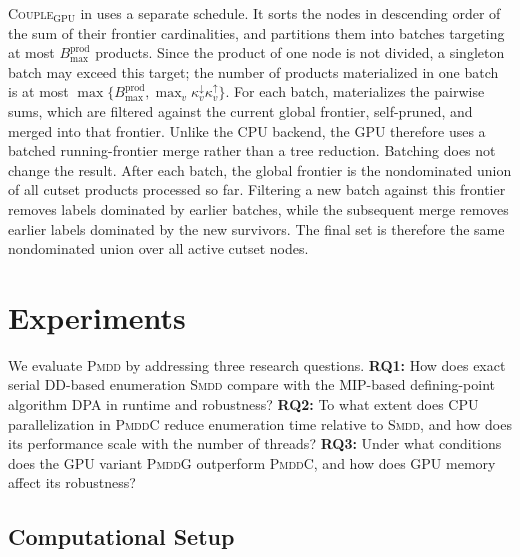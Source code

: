 \documentclass[letterpaper]{article}
\begin{document}
\textsc{Couple}$_{\mathrm{GPU}}$ in  uses a separate schedule. It sorts the nodes in descending order of the sum of their frontier cardinalities, and partitions them into batches targeting at most $B_{\max}^{\mathrm{prod}}$ products. Since the product of one node is not divided, a singleton batch may exceed this target; the number of products materialized in one batch is at most $\max\{B_{\max}^{\mathrm{prod}},\max_v \kappa_v^{\downarrow}\kappa_v^{\uparrow}\}$. For each batch,  materializes the pairwise sums, which are filtered against the current global frontier, self-pruned, and merged into that frontier. Unlike the CPU backend, the GPU therefore uses a batched running-frontier merge rather than a tree reduction. Batching does not change the result. After each batch, the global frontier is the nondominated union of all cutset products processed so far. Filtering a new batch against this frontier removes labels dominated by earlier batches, while the subsequent merge removes earlier labels dominated by the new survivors. The final set is therefore the same nondominated union over all active cutset nodes.


\section{Experiments}
\label{sec:experiments}

We evaluate \textsc{Pmdd} by addressing three research questions. \textbf{RQ1:} How does exact serial DD-based enumeration \textsc{Smdd} compare with the MIP-based defining-point algorithm DPA in runtime and robustness? \textbf{RQ2:} To what extent does CPU parallelization in \textsc{PmddC} reduce enumeration time relative to \textsc{Smdd}, and how does its performance scale with the number of threads? \textbf{RQ3:} Under what conditions does the GPU variant \textsc{PmddG} outperform \textsc{PmddC}, and how does GPU memory affect its robustness?

\subsection{Computational Setup}
\label{sec:setup}
\end{document}
